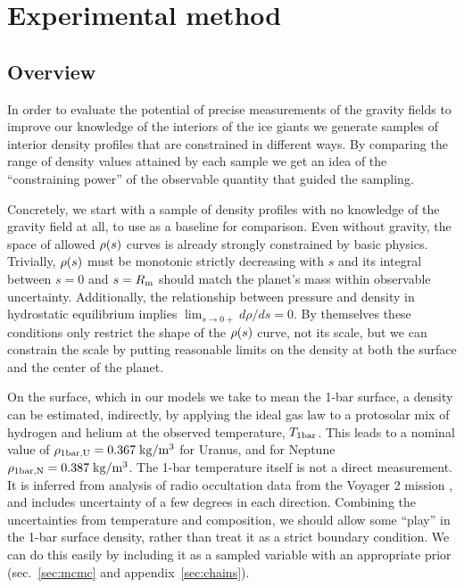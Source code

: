 
\section{Experimental method}\label{sec:method}

\subsection{Overview}\label{sec:overview}
In order to evaluate the potential of precise measurements of the gravity fields
to improve our knowledge of the interiors of the ice giants we generate samples
of interior density profiles that are constrained in different ways. By
comparing the range of density values attained by each sample we get an idea of
the ``constraining power'' of the observable quantity that guided the sampling.

Concretely, we start with a sample of density profiles with no knowledge of the
gravity field at all, to use as a baseline for comparison. Even without gravity,
the space of allowed $\rho(s)$ curves is already strongly constrained by basic
physics. Trivially, $\rho(s)$ must be monotonic strictly decreasing with $s$ and
its integral between $s=0$ and $s=R_{\text{m}}$ should match the planet's mass within
observable uncertainty. Additionally, the relationship between pressure and
density in hydrostatic equilibrium implies $\lim_{s\to{0+}}d\rho/ds=0$. By
themselves these conditions only restrict the shape of the $\rho(s)$ curve, not
its scale, but we can constrain the scale by putting reasonable limits on the
density at both the surface and the center of the planet.

On the surface, which in our models we take to mean the 1-bar surface, a density
can be estimated, indirectly, by applying the ideal gas law to a protosolar mix
of hydrogen and helium at the observed temperature, $T_{\text{1bar}}$. This leads to
a nominal value of $\rho_{\text{1bar,U}}=0.367\;\mathrm{kg/m^3}$ for Uranus, and for
Neptune $\rho_{\text{1bar,N}}=0.387\;\mathrm{kg/m^3}$. The 1-bar temperature itself is
not a direct measurement. It is inferred from analysis of radio occultation data
from the Voyager 2 mission \citep{Lindal1992}, and includes uncertainty of a few
degrees in each direction.  Combining the
uncertainties from temperature and composition, we should allow some ``play'' in
the 1-bar surface density, rather than treat it as a strict boundary condition.
We can do this easily by including it as a sampled variable with an appropriate
prior (sec.~\ref{sec:mcmc} and appendix~\ref{sec:chains}).

